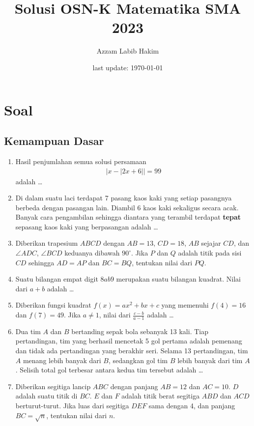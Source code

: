 \documentclass[12pt]{scrartcl}
\title{Solusi OSN-K Matematika SMA 2023}
\author{Azzam Labib Hakim}
\date{last update: \today}
\begin{document}
\maketitle
\vspace{-1.5cm}
\section{Soal}
\subsection{Kemampuan Dasar}
\begin{enumerate}
\item Hasil penjumlahan semua solusi persamaan
\begin{align*}
|x-|2x+6||=99
\end{align*}
adalah \dots

\item Di dalam suatu laci terdapat 7 pasang kaos kaki yang setiap pasangnya berbeda dengan pasangan lain. Diambil 6 kaos kaki sekaligus secara acak. Banyak cara pengambilan sehingga diantara yang terambil terdapat \textbf{tepat} sepasang kaos kaki yang berpasangan adalah \dots

\item Diberikan trapesium $ABCD$ dengan $AB = 13$, $CD = 18$, $AB$ sejajar $CD$,
dan $\angle ADC$, $\angle BCD$ keduanya dibawah $90^\circ$. Jika $P$ dan $Q$ adalah titik pada sisi $CD$ sehingga $AD = AP$ dan $BC = BQ$, tentukan nilai dari $PQ$.

\item Suatu bilangan empat digit $8ab9$ merupakan suatu bilangan kuadrat. Nilai dari $a+b$ adalah \dots

\item Diberikan fungsi kuadrat  $f(x) = ax^2+bx+c$ yang memenuhi $f(4)=16$ dan $f(7)=49$. Jika $a \neq 1$, nilai dari $\frac{c-b}{a-1}$ adalah \dots

\item Dua tim $A$ dan $B$ bertanding sepak bola sebanyak 13 kali. Tiap pertandingan, tim yang berhasil mencetak 5 gol pertama adalah pemenang dan tidak ada pertandingan yang berakhir seri. Selama 13 pertandingan, tim $A$ menang lebih banyak dari $B$, sedangkan gol tim $B$ lebih banyak dari tim $A$. Selisih total gol terbesar antara kedua tim tersebut adalah \dots

\item Diberikan segitiga lancip $ABC$ dengan panjang $AB = 12$ dan $AC = 10$. $D$ adalah suatu titik di $BC$. $E$ dan $F$ adalah titik berat segitiga $ABD$ dan $ACD$ berturut-turut. Jika luas dari segitiga $DEF$ sama dengan 4, dan panjang $BC = \sqrt{n}$, tentukan nilai dari $n$.


\end{enumerate}
\end{document}
